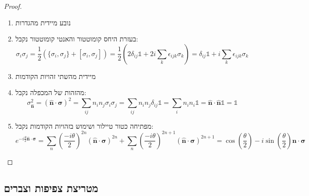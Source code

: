 \documentclass{tstextbook}
\begin{document}
\begin{proof}
  \begin{enumerate}
    \item נובע מיידית מהגדרות 


    \item בעזרת היחס קומוטטור והאנטי קומוטטור נקבל: 
$$\sigma_{i}\sigma_{j}={\frac{1}{2}}\left(\{\sigma_{i},\sigma_{j}\}+[\sigma_{i},\sigma_{j}]\right)={\frac{1}{2}}\left(2\delta_{i j}\mathbb{1}+2i{\underset{k}{\sum}}\epsilon_{i j k}\sigma_{k}\right)=\delta_{i j}\mathbb{1}+i{\underset{k}{\sum}}\epsilon_{i j k}\sigma_{k}$$


    \item מיידית מהשתי זהויות הקודמות 


    \item מהזהות של המכפלה נקבל: 
$$\sigma_{\mathbf{\hat{n}}}^{2}=\left({\hat{\mathbf{n}}}\cdot\boldsymbol\sigma\right)^{2}=\sum_{i j}n_{i}n_{j}\sigma_{i}\sigma_{j}=\sum_{i j}n_{i}n_{j}\delta_{i j}\mathbb{1}=\sum_{i}n_{i}n_{i}\mathbb{1}={\hat{\mathbf{n}}}\cdot{\hat{\mathbf{n}}}\mathbb{1}=\mathbb{1}$$


    \item מפתיחה כטור טיילור ושימוש בזהויות הקודמות נקבל: 
$$e^{-i{\frac{\theta}{2}}{\hat{\mathbf{n}}}\cdot\boldsymbol\sigma}=\sum_{n}\left({\frac{-i\theta}{2}}\right)^{2n}({\hat{\mathbf{n}}}\cdot\boldsymbol\sigma)^{2n}+\sum_{n}\left({\frac{-i\theta}{2}}\right)^{2n+1}({\hat{\mathbf{n}}}\cdot\boldsymbol\sigma)^{2n+1}=\cos\left({\frac{\theta}{2}}\right)-i\sin\left({\frac{\theta}{2}}\right){\hat{\mathbf{n}}}\cdot\boldsymbol\sigma$$


  \end{enumerate}
\end{proof}
\subsection{מטריצת צפיפות וצברים}
\end{document}
